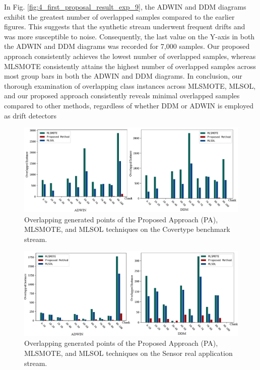 In Fig. \ref{fig:4_first_proposal_result_exp_9}, the ADWIN and DDM diagrams exhibit the greatest number of overlapped samples compared to the earlier figures. This suggests that the synthetic stream underwent frequent drifts and was more susceptible to noise. Consequently, the last value on the Y-axis in both the ADWIN and DDM diagrams was recorded for 7,000 samples. Our proposed approach consistently achieves the lowest number of overlapped samples, whereas MLSMOTE consistently attains the highest number of overlapped samples across most group bars in both the ADWIN and DDM diagrams. In conclusion, our thorough examination of overlapping class instances across MLSMOTE, MLSOL, and our proposed approach consistently reveals minimal overlapped samples compared to other methods, regardless of whether DDM or ADWIN is employed as drift detectors

\begin{figure}[!ht]
	\centering
	\includegraphics[width=1\linewidth]{4_Imbalanced/figures/exp_7.png}
  \caption{Overlapping generated points of the Proposed Approach (PA), MLSMOTE, and MLSOL techniques on the Covertype benchmark stream.}
	\label{fig:4_first_proposal_result_exp_7}
\end{figure}

\begin{figure}[!ht]
	\centering
	\includegraphics[width=1\linewidth]{4_Imbalanced/figures/exp_8.png}
  \caption{Overlapping generated points of the Proposed Approach (PA), MLSMOTE, and MLSOL techniques on the Sensor real application stream.}
	\label{fig:4_first_proposal_result_exp_8}
\end{figure}

